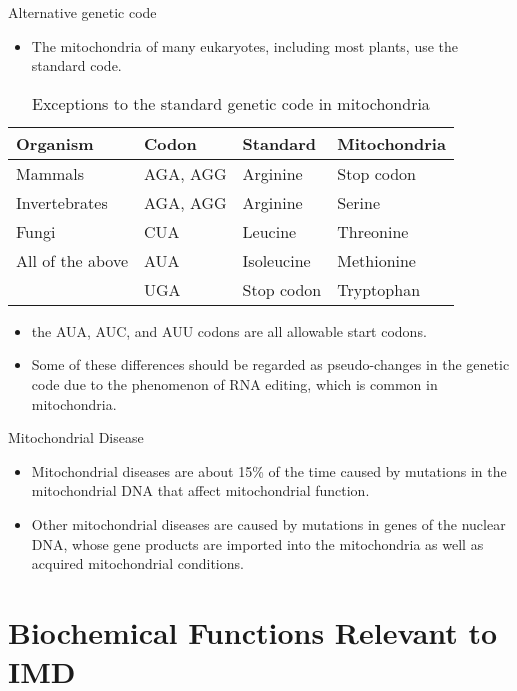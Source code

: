 \documentclass[presentation, smaller]{beamer}
\begin{document}
\begin{frame}[label={sec:org9d4764d}]{Alternative genetic code}
\begin{itemize}
\item The mitochondria of many eukaryotes, including most plants, use the
standard code.
\end{itemize}

\begin{table}[htbp]
\caption[mito code]{\label{tab:org468389c}
Exceptions to the standard genetic code in mitochondria}
\centering
\begin{tabular}{llll}
Organism & Codon & Standard & Mitochondria\\
\hline
Mammals & AGA, AGG & Arginine & Stop codon\\
Invertebrates & AGA, AGG & Arginine & Serine\\
Fungi & CUA & Leucine & Threonine\\
All of the above & AUA & Isoleucine & Methionine\\
 & UGA & Stop codon & Tryptophan\\
\end{tabular}
\end{table}

\begin{itemize}
\item the AUA, AUC, and AUU codons are all allowable start codons.
\item Some of these differences should be regarded as pseudo-changes in
the genetic code due to the phenomenon of RNA editing, which is
common in mitochondria.
\end{itemize}
\end{frame}


\begin{frame}[label={sec:orgd3563d6}]{Mitochondrial Disease}
\begin{itemize}
\item Mitochondrial diseases are about 15\% of the time caused by mutations
in the mitochondrial DNA that affect mitochondrial function.
\item Other mitochondrial diseases are caused by mutations in genes of the
nuclear DNA, whose gene products are imported into the mitochondria
as well as acquired mitochondrial conditions.
\end{itemize}
\end{frame}

\section{Biochemical Functions Relevant to IMD}
\label{sec:org6b9c34c}
\end{document}
